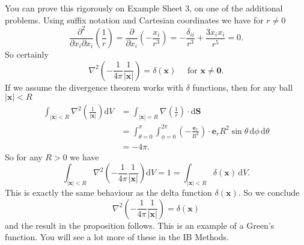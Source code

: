 You can prove this rigorously on Example Sheet 3, on one of the additional problems. Using suffix notation and Cartesian coordinates we have for $r \neq 0$
\[
\frac{\partial^{2}}{\partial x_{i} \partial x_{i}}\left(\frac{1}{r}\right)=\frac{\partial}{\partial x_{i}}\left(-\frac{x_{i}}{r^{3}}\right)=-\frac{\delta_{i i}}{r^{3}}+\frac{3 x_{i} x_{i}}{r^{5}}=0.
\]
So certainly
\[
\nabla^{2}\left(-\frac{1}{4 \pi} \frac{1}{|\mathbf{x}|}\right)=\delta(\mathbf{x}) \quad \text { for } \mathbf{x} \neq \mathbf{0}.
\]
If we assume the divergence theorem works with $ \delta $ functions, then for any ball $|\mathbf{x}|<R$
\[
\begin{aligned}
\int_{|\mathbf{x}|<R} \nabla^{2}\left(\frac{1}{|\mathbf{x}|}\right) \mathrm{d} V &=\int_{|\mathbf{x}|=R} \nabla\left(\frac{1}{r}\right) \cdot \mathrm{d} \mathbf{S} \\
&=\int_{\theta=0}^{\pi} \int_{\phi=0}^{2 \pi}\left(-\frac{\mathbf{e}_{r}}{R^{2}}\right) \cdot \mathbf{e}_{r} R^{2} \sin \theta \,\mathrm{d} \phi \,\mathrm{d} \theta \\
&=-4 \pi.
\end{aligned}
\]
So for any $R>0$ we have
\[
\int_{|\mathbf{x}|<R} \nabla^{2}\left(-\frac{1}{4 \pi} \frac{1}{|\mathbf{x}|}\right) \mathrm{d} V=1=\int_{|\mathbf{x}|<R} \delta(\mathbf{x}) \,\mathrm{d} V.
\]
This is exactly the same behaviour as the delta function $\delta(\mathbf{x}) .$ So we conclude
\[
\nabla^{2}\left(-\frac{1}{4 \pi} \frac{1}{|\mathbf{x}|}\right)=\delta(\mathbf{x})
\]
and the result in the proposition follows. This is an example of a Green's function. You will see a lot more of these in the IB Methods.

